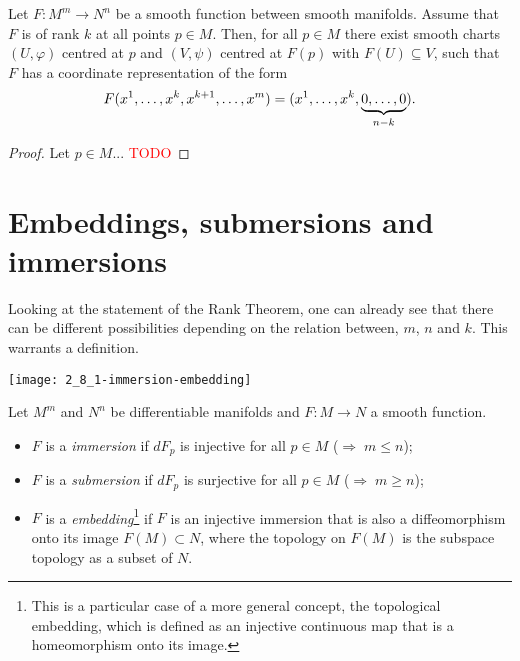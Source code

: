 \begin{theorem}\label{thm:rank}
  Let $F : M^m \to N^n$ be a smooth function between smooth manifolds.
  Assume that $F$ is of rank $k$ at all points $p\in M$.
  Then, for all $p\in M$ there exist smooth charts $(U, \varphi)$ centred at $p$ and $(V, \psi)$ centred at $F(p)$ with $F(U)\subseteq V$, such that $F$ has a coordinate representation of the form
  \begin{equation}
    F(x^1, \ldots, x^k, x^{k+1}, \ldots, x^m) = (x^1, \ldots, x^k, \LaTeXunderbrace{0, \ldots, 0}_{n-k}).
  \end{equation}
\end{theorem}
\begin{proof}
  Let $p\in M$... \textcolor{red}{TODO}
\end{proof}

\section{Embeddings, submersions and immersions}

Looking at the statement of the Rank Theorem, one can already see that there can be different possibilities depending on the relation between, $m$, $n$ and $k$. This warrants a definition.

\begin{marginfigure}
  \texttt{[image: 2\_8\_1-immersion-embedding]}
\end{marginfigure}
\begin{definition}
  Let $M^m$ and $N^n$ be differentiable manifolds and $F:M\to N$ a smooth function.
  \begin{itemize}
    \item $F$ is a \emph{immersion} if $dF_p$ is injective for all $p\in M$ ($\Rightarrow\; m\leq n$);
    \item $F$ is a \emph{submersion} if $dF_p$ is surjective for all $p\in M$ ($\Rightarrow\; m\geq n$);
    \item $F$ is a \emph{embedding}\footnote{This is a particular case of a more general concept, the topological embedding, which is defined as an injective continuous map that is a homeomorphism onto its image.} if $F$ is an injective immersion that is also a diffeomorphism onto its image $F(M)\subset N$, where the topology on $F(M)$ is the subspace topology as a subset of $N$.
  \end{itemize}
\end{definition}

